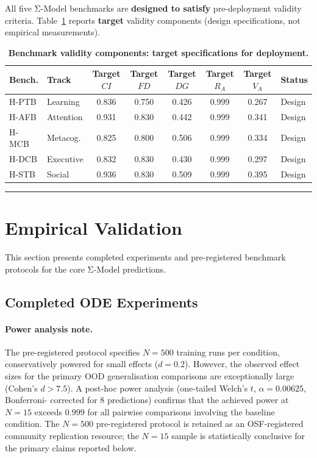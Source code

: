 \documentclass[10pt]{article}
\begin{document}
All five Σ-Model benchmarks are \textbf{designed to satisfy} pre-deployment
validity criteria. Table~\ref{tab:validity} reports \textbf{target} validity
components (design specifications, not empirical measurements).

\begin{table}[htbp]
\centering
\caption{\textbf{Benchmark validity components: target specifications for deployment.}} %
\label{tab:validity}
\small
\begin{tabular}{l l c c c c c l}
\toprule
\textbf{Bench.} & \textbf{Track} & \textbf{Target $CI$} & \textbf{Target $FD$} & \textbf{Target $DG$} & \textbf{Target $R_A$} & \textbf{Target $V_A$} & \textbf{Status} \\
\midrule
H-PTB & Learning & 0.836 & 0.750 & 0.426 & 0.999 & 0.267 & Design \\
H-AFB & Attention & 0.931 & 0.830 & 0.442 & 0.999 & 0.341 & Design \\
H-MCB & Metacog. & 0.825 & 0.800 & 0.506 & 0.999 & 0.334 & Design \\
H-DCB & Executive & 0.832 & 0.830 & 0.430 & 0.999 & 0.297 & Design \\
H-STB & Social & 0.936 & 0.830 & 0.509 & 0.999 & 0.395 & Design \\
\bottomrule
\end{tabular}
\end{table}

\noindent\rule{\linewidth}{0.4pt}

\section{Empirical Validation}\label{sec:empirical-validation}

This section presents completed experiments and pre-registered benchmark
protocols for the core Σ-Model predictions.

\subsection{Completed ODE Experiments}\label{sec:completed-ode}

\paragraph{Power analysis note.}
The pre-registered protocol specifies $N = 500$ training runs per
condition, conservatively powered for small effects ($d = 0.2$).
However, the observed effect sizes for the primary OOD generalisation
comparisons are exceptionally large (Cohen's $d > 7.5$). A post-hoc
power analysis (one-tailed Welch's $t$, $\alpha = 0.00625$, Bonferroni-
corrected for 8 predictions) confirms that the achieved power at
$N = 15$ exceeds $0.999$ for all pairwise comparisons involving the
baseline condition. The $N = 500$ pre-registered protocol is retained as
an OSF-registered community replication resource; the $N = 15$ sample is
statistically conclusive for the primary claims reported below.
\end{document}
